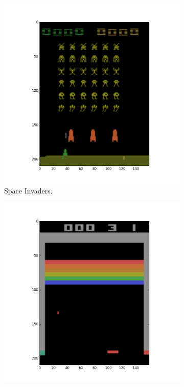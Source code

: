 \documentclass[11pt]{article}
\begin{document}
\begin{figure}[H]
    \begin{subfigure}{.3\textwidth}
        \centering
        \includegraphics[scale=0.25]{include/space_invaders_1.png}
        \caption{Space Invaders.}
        \label{fig:scan}
    \end{subfigure}
    \begin{subfigure}{.3\textwidth}
        \centering
        \includegraphics[scale=0.25]{include/breakout_1.png}

\end{subfigure}
\end{figure}
\end{document}
